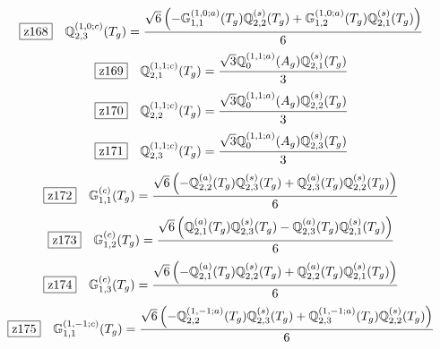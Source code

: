 \documentclass[fleqn,10pt,landscape]{jsarticle}
\begin{document}
\begin{dmath*}
\hspace*{3mm}\fbox{z168}\quad \mathbb{Q}_{2,3}^{(1,0;c)}(T_{g})=\frac{\sqrt{6} \left(- \mathbb{G}_{1,1}^{(1,0;a)}(T_{g}) \mathbb{Q}_{2,2}^{(s)}(T_{g}) + \mathbb{G}_{1,2}^{(1,0;a)}(T_{g}) \mathbb{Q}_{2,1}^{(s)}(T_{g})\right)}{6}
\end{dmath*}
\begin{dmath*}
\hspace*{3mm}\fbox{z169}\quad \mathbb{Q}_{2,1}^{(1,1;c)}(T_{g})=\frac{\sqrt{3} \mathbb{Q}_{0}^{(1,1;a)}(A_{g}) \mathbb{Q}_{2,1}^{(s)}(T_{g})}{3}
\end{dmath*}
\begin{dmath*}
\hspace*{3mm}\fbox{z170}\quad \mathbb{Q}_{2,2}^{(1,1;c)}(T_{g})=\frac{\sqrt{3} \mathbb{Q}_{0}^{(1,1;a)}(A_{g}) \mathbb{Q}_{2,2}^{(s)}(T_{g})}{3}
\end{dmath*}
\begin{dmath*}
\hspace*{3mm}\fbox{z171}\quad \mathbb{Q}_{2,3}^{(1,1;c)}(T_{g})=\frac{\sqrt{3} \mathbb{Q}_{0}^{(1,1;a)}(A_{g}) \mathbb{Q}_{2,3}^{(s)}(T_{g})}{3}
\end{dmath*}
\begin{dmath*}
\hspace*{3mm}\fbox{z172}\quad \mathbb{G}_{1,1}^{(c)}(T_{g})=\frac{\sqrt{6} \left(- \mathbb{Q}_{2,2}^{(a)}(T_{g}) \mathbb{Q}_{2,3}^{(s)}(T_{g}) + \mathbb{Q}_{2,3}^{(a)}(T_{g}) \mathbb{Q}_{2,2}^{(s)}(T_{g})\right)}{6}
\end{dmath*}
\begin{dmath*}
\hspace*{3mm}\fbox{z173}\quad \mathbb{G}_{1,2}^{(c)}(T_{g})=\frac{\sqrt{6} \left(\mathbb{Q}_{2,1}^{(a)}(T_{g}) \mathbb{Q}_{2,3}^{(s)}(T_{g}) - \mathbb{Q}_{2,3}^{(a)}(T_{g}) \mathbb{Q}_{2,1}^{(s)}(T_{g})\right)}{6}
\end{dmath*}
\begin{dmath*}
\hspace*{3mm}\fbox{z174}\quad \mathbb{G}_{1,3}^{(c)}(T_{g})=\frac{\sqrt{6} \left(- \mathbb{Q}_{2,1}^{(a)}(T_{g}) \mathbb{Q}_{2,2}^{(s)}(T_{g}) + \mathbb{Q}_{2,2}^{(a)}(T_{g}) \mathbb{Q}_{2,1}^{(s)}(T_{g})\right)}{6}
\end{dmath*}
\begin{dmath*}
\hspace*{3mm}\fbox{z175}\quad \mathbb{G}_{1,1}^{(1,-1;c)}(T_{g})=\frac{\sqrt{6} \left(- \mathbb{Q}_{2,2}^{(1,-1;a)}(T_{g}) \mathbb{Q}_{2,3}^{(s)}(T_{g}) + \mathbb{Q}_{2,3}^{(1,-1;a)}(T_{g}) \mathbb{Q}_{2,2}^{(s)}(T_{g})\right)}{6}
\end{dmath*}
\end{document}
